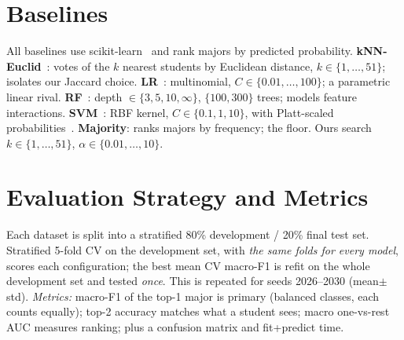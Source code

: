 \documentclass[sigconf]{acmart}
\begin{document}
\section{Baselines}
All baselines use scikit-learn~\cite{pedregosa2011sklearn} and rank majors by predicted probability. \textbf{kNN-Euclid}~\cite{cover1967knn}: votes of the $k$ nearest students by Euclidean distance, $k\in\{1,\dots,51\}$; isolates our Jaccard choice.
\textbf{LR}~\cite{cox1958lr}: multinomial, $C\in\{0.01,\dots,100\}$; a parametric linear rival.
\textbf{RF}~\cite{breiman2001rf}: depth $\in\{3,5,10,\infty\}$, $\{100,300\}$ trees; models feature interactions.
\textbf{SVM}~\cite{cortes1995svm}: RBF kernel, $C\in\{0.1,1,10\}$, with Platt-scaled probabilities~\cite{platt1999}.
\textbf{Majority}: ranks majors by frequency; the floor. Ours search $k\in\{1,\dots,51\}$, $\alpha\in\{0.01,\dots,10\}$.

\section{Evaluation Strategy and Metrics}
Each dataset is split into a stratified 80\% development / 20\% final test set. Stratified 5-fold CV on the development set, with \emph{the same folds for every model}, scores each configuration; the best mean CV macro-F1 is refit on the whole development set and tested \emph{once}. This is repeated for seeds 2026--2030 (mean$\pm$std).
\emph{Metrics:} macro-F1 of the top-1 major is primary (balanced classes, each counts equally); top-2 accuracy matches what a student sees; macro one-vs-rest AUC measures ranking; plus a confusion matrix and fit+predict time.
\end{document}

